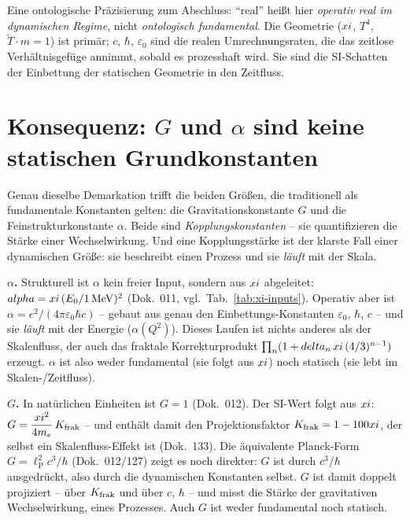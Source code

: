 Eine ontologische Präzisierung zum Abschluss: ``real'' heißt hier \emph{operativ
real im dynamischen Regime}, nicht \emph{ontologisch fundamental}. Die Geometrie
($xi$, $T^4$, $\tilde T\cdot m=1$) ist primär; $c$, $\hbar$, $\varepsilon_0$
sind die realen Umrechnungsraten, die das zeitlose Verhältnisgefüge annimmt,
sobald es prozesshaft wird. Sie sind die SI-Schatten der Einbettung der statischen
Geometrie in den Zeitfluss.

\section{Konsequenz: $G$ und $\alpha$ sind keine statischen Grundkonstanten}
\label{sec:G-alpha}

Genau dieselbe Demarkation trifft die beiden Größen, die traditionell als
fundamentale Konstanten gelten: die Gravitationskonstante $G$ und die
Feinstrukturkonstante $\alpha$. Beide sind \emph{Kopplungskonstanten} -- sie
quantifizieren die Stärke einer Wechselwirkung. Und eine Kopplungsstärke ist der
klarste Fall einer dynamischen Größe: sie beschreibt einen Prozess und sie
\emph{läuft} mit der Skala.

\textbf{$\alpha$.} Strukturell ist $\alpha$ kein freier Input, sondern aus
$xi$ abgeleitet: $alpha=xi\,(E_0/1\,\mathrm{MeV})^2$ (Dok.~011,
vgl.~Tab.~\ref{tab:xi-inputs}). Operativ aber ist
$\alpha=e^2/(4\pi\varepsilon_0\hbar c)$ -- gebaut aus genau den
Einbettungs-Konstanten $\varepsilon_0$, $\hbar$, $c$ -- und sie \emph{läuft} mit
der Energie ($\alpha(Q^2)$). Dieses Laufen ist nichts anderes als der
Skalenfluss, der auch das fraktale Korrekturprodukt
$\prod_n(1+delta_n\,xi\,(4/3)^{n-1})$ erzeugt. $\alpha$ ist also weder
fundamental (sie folgt aus $xi$) noch statisch (sie lebt im
Skalen-/Zeitfluss).

\textbf{$G$.} In natürlichen Einheiten ist $G=1$ (Dok.~012). Der SI-Wert folgt aus
$xi$: $G=\dfrac{xi^2}{4m_e}\,K_{\text{frak}}$ -- und enthält damit den
Projektionsfaktor $K_{\text{frak}}=1-100xi$, der selbst ein Skalenfluss-Effekt ist
(Dok.~133). Die äquivalente Planck-Form $G=\ell_{\mathrm P}^2 c^3/\hbar$
(Dok.~012/127) zeigt es noch direkter: $G$ ist durch $c^3/\hbar$ ausgedrückt, also
durch die dynamischen Konstanten selbst. $G$ ist damit doppelt projiziert -- über
$K_{\text{frak}}$ und über $c$, $\hbar$ -- und misst die Stärke der gravitativen
Wechselwirkung, eines Prozesses. Auch $G$ ist weder fundamental noch statisch.

